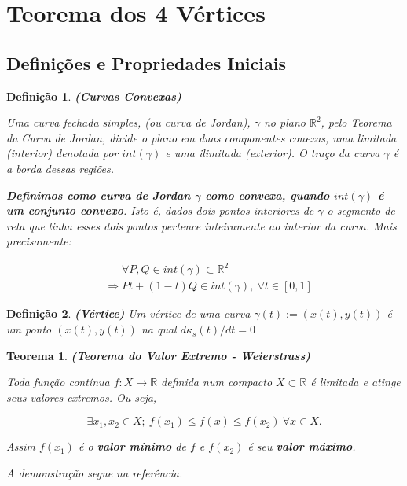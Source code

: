 \documentclass[12pt,letterpaper]{article}
\newtheorem{defi}{Definição}
\newtheorem{teo}{Teorema}
\newcommand{\real}{\mathbb{R}}
\newcommand{\rr}{\mathbb{R}^2}
\begin{document}
	\section{Teorema dos 4 Vértices}
	
	\subsection{Definições e Propriedades Iniciais}
	
	\begin{defi}
		\textbf{(Curvas Convexas)}
		\label{convexcurve}
		
		Uma curva fechada simples, (ou curva de Jordan), $\gamma$ no plano $\rr$, pelo Teorema da Curva de Jordan\cite{wiki:Jordan_curve_theorem}, divide o plano em duas componentes conexas, uma limitada (interior) denotada por $int(\gamma)$ e uma ilimitada (exterior). O traço da curva $\gamma$ é a borda dessas regiões.
		
		\textbf{Definimos como curva de Jordan $\gamma$ como convexa, quando $int(\gamma)$ é um conjunto convexo}. Isto é, dados dois pontos interiores de $\gamma$ o segmento de reta que linha esses dois pontos pertence inteiramente ao interior da curva. Mais precisamente:
		
		\begin{align*}
			&~~~~~~~\forall P,Q\in int(\gamma)\subset\rr\\
			&\Rightarrow Pt+(1-t)Q\in int(\gamma),~\forall t\in[0,1]
		\end{align*}
	\end{defi}
	
	
	\begin{defi}
		\textbf{(Vértice)} Um vértice de uma curva $\gamma(t):=(x(t),y(t))$ é um ponto $(x(t),y(t))$ na qual $d\kappa_s(t)/dt=0$
	\end{defi}
	
	\begin{teo}
		\textbf{(Teorema do Valor Extremo - Weierstrass)}
		\label{extremevalue} \cite{lima1981curso}
		
		Toda função contínua $f:X\to\real$ definida num compacto $X\subset\real$ é limitada e atinge seus valores extremos. Ou seja,
		
		$$\exists x_1,x_2\in X;~f(x_1)\leq f(x)\leq f(x_2)~\forall x \in X.$$
		
		Assim $f(x_1)$ é o \textbf{valor mínimo} de $f$ e $f(x_2)$ é seu \textbf{valor máximo}.
		
		A demonstração segue na referência.
	\end{teo}
\end{document}
